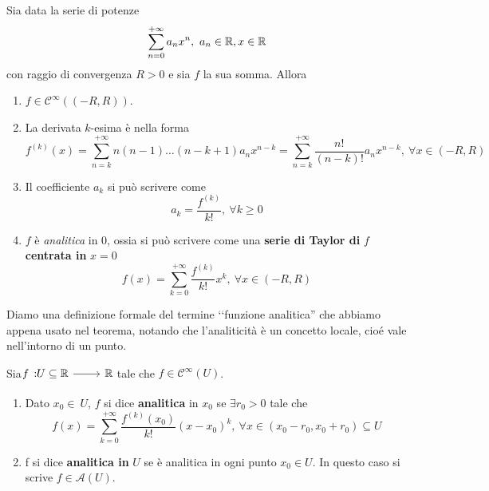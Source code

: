 \begin{theorema}
	Sia data la serie di potenze
	\begin{equation*}
		\sum_{n=0}^{+\infty}a_nx^n,\ a_n\in\mathbb{R}, x\in\mathbb{R}
	\end{equation*}
con raggio di convergenza $R>0$ e sia $f$ la sua somma. Allora
\begin{enumerate}
	\item $f\in\mathcal{C}^{\infty}\left(\left(-R,R\right)\right)$.
	\item La derivata $k$-esima è nella forma
	\begin{equation}
		f^{\left(k\right)}\left(x\right)=\sum_{n=k}^{+\infty}n\left(n-1\right)\ldots\left(n-k+1\right)a_nx^{n-k}=\sum_{n=k}^{+\infty}\frac{n!}{\left(n-k\right)!}a_nx^{n-k},\ \forall x\in\left(-R,R\right)
	\end{equation}
	\item Il coefficiente $a_k$ si può scrivere come
	\begin{equation}
		a_k=\frac{f^{\left(k\right)}}{k!},\ \forall k\geq 0
	\end{equation}
	\item $f$ è \textit{analitica} in $0$, ossia si può scrivere come una \textbf{serie di Taylor di }$f$\textbf{centrata in }$x=0$
	\begin{equation}
		f\left(x\right)=\sum_{k=0}^{+\infty}\frac{f^{\left(k\right)}}{k!}x^k,\ \forall x\in\left(-R,R\right)
	\end{equation}
\end{enumerate}
\end{theorema}
Diamo una definizione formale del termine ‘‘funzione analitica'' che abbiamo appena usato nel teorema, notando che l'analiticità è un concetto locale, cioé vale nell'intorno di un punto.
\begin{define}
	Sia $\funz{f}{U\subseteq \realset}{\realset}$ tale che $f\in\mathcal{C}^{\infty}\left(U\right)$.
	\begin{enumerate}
		\item Dato $x_0\in\ U$, $f$ si dice \textbf{analitica} in $x_0$ se $\exists r_0>0$ tale che
		\begin{equation*}
			f\left(x\right)=\sum_{k=0}^{+\infty}\frac{f^{\left(k\right)}\left(x_0\right)}{k!}\left(x-x_0\right)^k,\ \forall x\in\left(x_0-r_0,x_0+r_0\right)\subseteq U
		\end{equation*}
		\item f si dice \textbf{analitica in }$U$ se è analitica in ogni punto $x_0\in U$. In questo caso si scrive $f\in\mathcal{A}\left(U\right)$.
	\end{enumerate}
\end{define}
